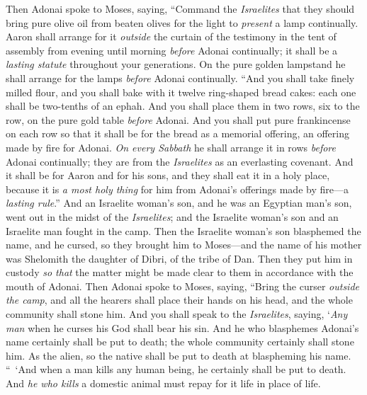 \begin{biblechapter} %
 Then Adonai spoke to Moses, saying,
\verse “Command the \textit{Israelites} that they should bring pure olive oil from beaten olives for the light to \textit{present} a lamp continually.
\verse Aaron shall arrange for it \textit{outside} the curtain of the testimony in the tent of assembly from evening until morning \textit{before} Adonai continually; it shall be a \textit{lasting statute} throughout your generations.
\verse On the pure golden lampstand he shall arrange for the lamps \textit{before} Adonai continually.
\verse “And you shall take finely milled flour, and you shall bake with it twelve ring-shaped bread cakes: each one shall be two-tenths of an ephah.
\verse And you shall place them in two rows, six to the row, on the pure gold table \textit{before} Adonai.
\verse And you shall put pure frankincense on each row so that it shall be for the bread as a memorial offering, an offering made by fire for Adonai.
\verse \textit{On every Sabbath} he shall arrange it in rows \textit{before} Adonai continually; they are from the \textit{Israelites} as an everlasting covenant.
\verse And it shall be for Aaron and for his sons, and they shall eat it in a holy place, because it is \textit{a most holy thing} for him from Adonai’s offerings made by fire—a \textit{lasting rule}.”
 And an Israelite woman’s son, and he was an Egyptian man’s son, went out in the midst of the \textit{Israelites}; and the Israelite woman’s son and an Israelite man fought in the camp.
\verse Then the Israelite woman’s son blasphemed the name, and he cursed, so they brought him to Moses—and the name of his mother was Shelomith the daughter of Dibri, of the tribe of Dan.
\verse Then they put him in custody \textit{so that} the matter might be made clear to them in accordance with the mouth of Adonai.
\verse Then Adonai spoke to Moses, saying,
\verse “Bring the curser \textit{outside the camp}, and all the hearers shall place their hands on his head, and the whole community shall stone him.
\verse And you shall speak to the \textit{Israelites}, saying, ‘\textit{Any man} when he curses his God shall bear his sin.
\verse And he who blasphemes Adonai’s name certainly shall be put to death; the whole community certainly shall stone him. As the alien, so the native shall be put to death at blaspheming his name.
\verse “ ‘And when a man kills any human being, he certainly shall be put to death.
\verse And \textit{he who kills} a domestic animal must repay for it life in place of life.

\end{biblechapter}
